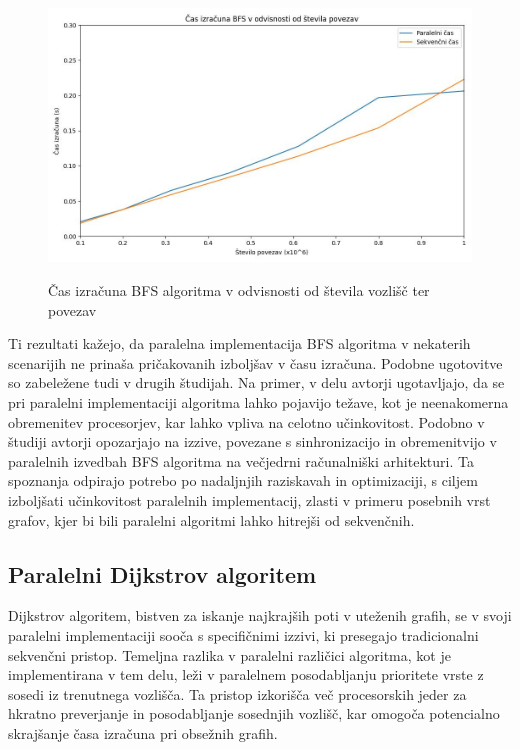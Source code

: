 \documentclass[mat1, tisk]{fmfdelo}
\begin{document}
\begin{figure}[h!]
  \centering
  \caption{Čas izračuna BFS algoritma v odvisnosti od števila vozlišč ter povezav}
  \includegraphics[width=15cm]{slike/bfs_v_odvisnosti_od_velikosti_grafa.jpg}
  \label{fig:bfs_calculation_time_by_graph_size}
\end{figure}

Ti rezultati kažejo, da paralelna implementacija BFS algoritma v nekaterih scenarijih ne prinaša pričakovanih izboljšav v času izračuna.
Podobne ugotovitve so zabeležene tudi v drugih študijah. Na primer, v delu \cite{kuroiwa2020analyzing} avtorji ugotavljajo,
da se pri paralelni implementaciji algoritma lahko pojavijo težave, kot je neenakomerna obremenitev procesorjev, kar
lahko vpliva na celotno učinkovitost. Podobno v študiji \cite{rudolf2019breadth} avtorji opozarjajo na izzive, povezane
s sinhronizacijo in obremenitvijo v paralelnih izvedbah BFS algoritma na večjedrni računalniški arhitekturi.
Ta spoznanja odpirajo potrebo po nadaljnjih raziskavah in optimizaciji, s ciljem izboljšati učinkovitost paralelnih implementacij,
zlasti v primeru posebnih vrst grafov, kjer bi bili paralelni algoritmi lahko hitrejši od sekvenčnih.

\subsection{Paralelni Dijkstrov algoritem} \label{section:dijkstra}

Dijkstrov algoritem, bistven za iskanje najkrajših poti v uteženih grafih, se v svoji paralelni implementaciji sooča s
specifičnimi izzivi, ki presegajo tradicionalni sekvenčni pristop. Temeljna razlika v paralelni različici algoritma,
kot je implementirana v tem delu, leži v paralelnem posodabljanju prioritete vrste z sosedi iz trenutnega vozlišča.
Ta pristop izkorišča več procesorskih jeder za hkratno preverjanje in posodabljanje sosednjih vozlišč, kar omogoča
potencialno skrajšanje časa izračuna pri obsežnih grafih. 
\end{document}
